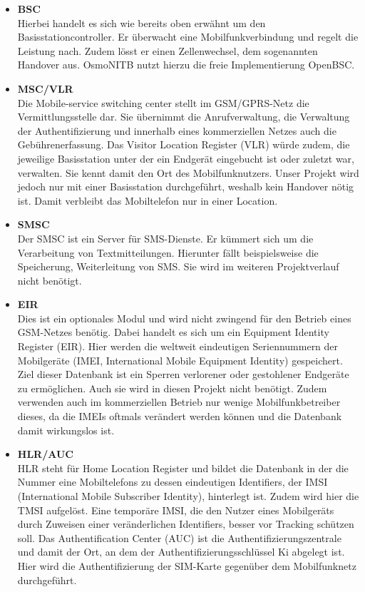 \begin{itemize}

\item \textbf{BSC}\\
Hierbei handelt es sich wie bereits oben erwähnt um den Basisstationcontroller. Er überwacht eine Mobilfunkverbindung und regelt die Leistung nach. Zudem lösst er einen Zellenwechsel, dem sogenannten Handover aus. OsmoNITB nutzt hierzu die freie Implementierung OpenBSC.  

 
\item \textbf{MSC/VLR}\\
Die Mobile-service switching center stellt im GSM/GPRS-Netz die Vermittlungsstelle dar. Sie übernimmt die Anrufverwaltung, die Verwaltung der Authentifizierung und innerhalb eines kommerziellen Netzes auch die Gebührenerfassung. Das Visitor Location Register (VLR) würde zudem, die jeweilige Basisstation unter der ein Endgerät eingebucht ist oder zuletzt war, verwalten. Sie kennt damit den Ort des Mobilfunknutzers. Unser Projekt wird jedoch nur mit einer Basisstation durchgeführt, weshalb kein Handover nötig ist. Damit verbleibt das Mobiltelefon nur in einer Location. 


\item \textbf{SMSC}\\
Der SMSC ist ein Server für SMS-Dienste. Er kümmert sich um die Verarbeitung von Textmitteilungen. Hierunter fällt beispielsweise die Speicherung, Weiterleitung von SMS. Sie wird im weiteren Projektverlauf nicht benötigt.


\item \textbf{EIR}\\
Dies ist ein optionales Modul und wird nicht zwingend für den Betrieb eines GSM-Netzes benötig. Dabei handelt es sich um ein Equipment Identity Register (EIR). Hier werden die weltweit eindeutigen Seriennummern der Mobilgeräte (IMEI, International Mobile Equipment Identity) gespeichert. Ziel dieser Datenbank ist ein Sperren verlorener oder gestohlener Endgeräte zu ermöglichen. Auch sie wird in diesen Projekt nicht benötigt. Zudem verwenden auch im kommerziellen Betrieb nur wenige Mobilfunkbetreiber dieses, da die IMEIs oftmals verändert werden können und die Datenbank damit wirkungslos ist.  


\item \textbf{HLR/AUC}\\
HLR steht für Home Location Register und bildet die Datenbank in der die Nummer eine Mobiltelefons zu dessen eindeutigen Identifiers, der IMSI (International Mobile Subscriber Identity), hinterlegt ist. Zudem wird hier die TMSI aufgelöst. Eine temporäre IMSI, die den Nutzer eines Mobilgeräts durch Zuweisen einer veränderlichen Identifiers, besser vor Tracking schützen soll. Das Authentification Center (AUC) ist die Authentifizierungszentrale und damit der Ort, an dem der Authentifizierungsschlüssel Ki abgelegt ist. Hier wird die Authentifizierung der SIM-Karte gegenüber dem Mobilfunknetz durchgeführt. 


\end{itemize}


